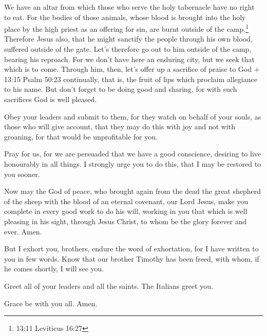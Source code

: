  We have an altar from which those who serve the holy
tabernacle have no right to eat.  For the bodies of those
animals, whose blood is brought into the holy place by the high priest
as an offering for sin, are burnt outside of the camp.\footnote{13:11
  Leviticus 16:27}  Therefore Jesus also, that he might
sanctify the people through his own blood, suffered outside of the gate.
 Let's therefore go out to him outside of the camp, bearing
his reproach.  For we don't have here an enduring city, but
we seek that which is to come.  Through him, then, let's
offer up a sacrifice of praise to God + 13:15 Psalm 50:23 continually,
that is, the fruit of lips which proclaim allegiance to his name.
 But don't forget to be doing good and sharing, for with
such sacrifices God is well pleased.

 Obey your leaders and submit to them, for they watch on
behalf of your souls, as those who will give account, that they may do
this with joy and not with groaning, for that would be unprofitable for
you.

 Pray for us, for we are persuaded that we have a good
conscience, desiring to live honourably in all things.  I
strongly urge you to do this, that I may be restored to you sooner.

 Now may the God of peace, who brought again from the dead
the great shepherd of the sheep with the blood of an eternal covenant,
our Lord Jesus,  make you complete in every good work to do
his will, working in you that which is well pleasing in his sight,
through Jesus Christ, to whom be the glory forever and ever. Amen.

 But I exhort you, brothers, endure the word of
exhortation, for I have written to you in few words.  Know
that our brother Timothy has been freed, with whom, if he comes shortly,
I will see you.

 Greet all of your leaders and all the saints. The Italians
greet you.

 Grace be with you all. Amen.
